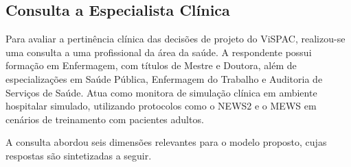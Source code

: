 \documentclass[twoside,english,brazilian]{UNISINOSmonografia}
\begin{document}
\subsection{Consulta a Especialista Clínica}
\label{sec:validacao_especialista}

Para avaliar a pertinência clínica das decisões de projeto do ViSPAC, realizou-se uma consulta a uma profissional da área da saúde. A respondente possui formação em Enfermagem, com títulos de Mestre e Doutora, além de especializações em Saúde Pública, Enfermagem do Trabalho e Auditoria de Serviços de Saúde. Atua como monitora de simulação clínica em ambiente hospitalar simulado, utilizando protocolos como o NEWS2 e o MEWS em cenários de treinamento com pacientes adultos.

A consulta abordou seis dimensões relevantes para o modelo proposto, cujas respostas são sintetizadas a seguir.
\end{document}
